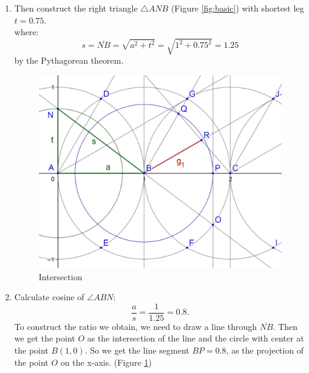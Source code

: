 \documentclass[12pt, letterpaper, oneside]{report}
\begin{document}
\begin{enumerate}
	\item Then construct the right triangle $\triangle ANB$ (Figure \ref{fig:basic}) with shortest leg $t=0.75$. \\
	where:
\begin{equation}
s=\overline{NB}=\sqrt{a^{2}+t^{2}}=\sqrt{1^{2}+0.75^{2}}=1.25
\end{equation}
by the Pythagorean theorem. 
\begin{figure}[h]
	\centerline{\includegraphics[scale=0.2]{images/intersection.jpg}}
	\caption{Intersection}
	\label{intersection}
\end{figure}
 
	\item Calculate cosine of $\angle ABN$:
\begin{equation}
	\dfrac{a}{s}=\dfrac{1}{1.25}=0.8.
\end{equation}
\newpage
To construct the ratio we obtain, we need to draw a line through $\overline{NB}$. Then we get the point $O$ as the intersection of the line and the circle with center at the point $B(1,0)$. So we get the line segment $BP=0.8$, as the projection of the point $O$ on the x-axis. (Figure \ref{intersection})\\ 
	

\end{enumerate}
\end{document}
